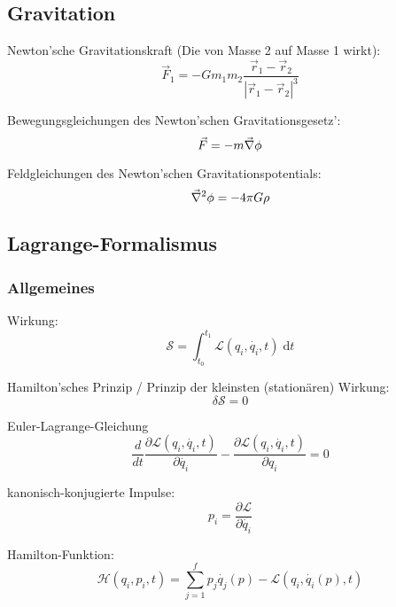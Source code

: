 \documentclass[11pt]{article}
\numberwithin{equation}{section}
\begin{document}
		\subsection{Gravitation}
			\noindent
			Newton'sche Gravitationskraft (Die von Masse 2 auf Masse 1 wirkt):
			\begin{equation}
				\vec{F}_1 = - G m_1 m_2 \frac{\vec{r}_1-\vec{r}_2}{\left|\vec{r}_1-\vec{r}_2\right|^3}
			\end{equation}

			\noindent
			Bewegungsgleichungen des Newton'schen Gravitationsgesetz':
			\begin{equation}
				\vec{F}=-m\vec{\nabla}\phi
			\end{equation}

			\noindent
			Feldgleichungen des Newton'schen Gravitationspotentials:
			\begin{equation}
				\vec{\nabla}^2\phi=-4\pi G\rho
			\end{equation}

		\subsection{Lagrange-Formalismus}
			\subsubsection{Allgemeines}
				\noindent
				Wirkung:
				\begin{equation}
					\mathcal{S}=\int_{t_0}^{t_1}\mathcal{L}(q_i, \dot{q_i},t)\;\mathrm{d} t
				\end{equation}

				\noindent
				Hamilton'sches Prinzip / Prinzip der kleinsten (stationären) Wirkung:
				\begin{equation}
					\delta \mathcal{S}=0
				\end{equation}

				\noindent
				Euler-Lagrange-Gleichung
				\begin{equation}
					 \frac{d}{dt} \frac{\partial \mathcal{L}(q_{i},\dot{q_{i}},t)}{\partial \dot{q_{i}}} - \frac{\partial \mathcal{L}(q_{i},\dot{q_{i}},t)}{\partial q_{i}} = 0
				\end{equation}

				\noindent
				kanonisch-konjugierte Impulse:
				\begin{equation}
					p_i=\frac{\partial \mathcal{L}}{\partial\dot{q_i}}
				\end{equation}

				\noindent
				Hamilton-Funktion:
				\begin{equation}
					\mathcal{H}(q_i,p_i,t)=\sum_{j=1}^{f}p_j\dot{q_j}(p) - \mathcal{L}(q_i, \dot{q_i}(p),t)
				\end{equation}
\end{document}
